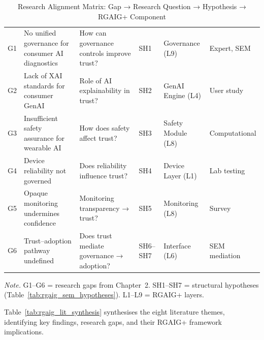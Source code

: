 \begingroup\singlespacing\tablefontsize\tablestripes
\begin{xltabular}{\textwidth}{@{} c p{2.5cm} X l p{2.5cm} p{2.0cm} @{}}
\caption[Research Alignment Matrix: Gap → Research Question →]{Research Alignment Matrix: Gap → Research Question → Hypothesis → RGAIG+ Component}
\label{tab:rgaig_gap_rq_hypothesis}\\
\toprule
{} &  &  &  &  &  \\
\midrule
\endfirsthead
\endhead
\bottomrule
\endlastfoot
G1 & No unified governance for consumer AI diagnostics & How can governance controls improve trust? & SH1 & Governance (L9) & Expert, SEM \\
\addlinespace
G2 & Lack of XAI standards for consumer GenAI & Role of AI explainability in trust? & SH2 & GenAI Engine (L4) & User study \\
\addlinespace
G3 & Insufficient safety assurance for wearable AI & How does safety affect trust? & SH3 & Safety Module (L8) & Computational \\
\addlinespace
G4 & Device reliability not governed & Does reliability influence trust? & SH4 & Device Layer (L1) & Lab testing \\
\addlinespace
G5 & Opaque monitoring undermines confidence & Monitoring transparency → trust? & SH5 & Monitoring (L8) & Survey \\
\addlinespace
G6 & Trust--adoption pathway undefined & Does trust mediate governance → adoption? & SH6--SH7 & Interface (L6) & SEM mediation \\
\end{xltabular}
\par\smallskip\noindent\textit{Note.} G1--G6 = research gaps from Chapter~2. SH1--SH7 = structural hypotheses (Table~\ref{tab:rgaig_sem_hypotheses}). L1--L9 = RGAIG+ layers.
\endgroup

Table~\ref{tab:rgaig_lit_synthesis} synthesises the eight literature themes, identifying key findings, research gaps, and their RGAIG+ framework implications.

